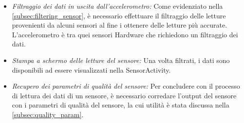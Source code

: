 \begin{itemize}
	\item \textit{Filtraggio dei dati in uscita dall'accelerometro:} Come evidenziato nella \autoref{subsec:filtering_sensor}, è necessario effettuare il filtraggio delle letture provenienti da alcuni sensori al fine i ottenere delle letture più accurate. L'accelerometro è tra quei sensori Hardware che richiedono un filtraggio dei dati.
	
	
	\item \textit{Stampa a schermo delle letture del sensore:} Una volta filtrati, i dati sono disponibili ad essere visualizzati nella SensorActivity.
	
	
	\item \textit{Recupero dei parametri di qualità del sensore:} Per concludere con il processo di lettura dei dati di un sensore, è necessario corredare l'output del sensore con i parametri di qualità del sensore, la cui utilità è stata discussa nella \autoref{subsec:quality_param}.
	
\end{itemize}

